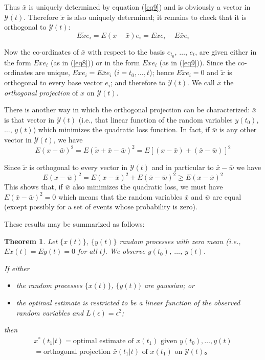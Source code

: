 \documentclass{article}
\newtheorem{theorem}{Theorem}
\newcommand{\manf}[1]{\mathbf{\mathcal{#1}}}
\begin{document}
Thus $\bar{x}$ is uniquely determined by equation (\ref{eq9}) and is obviously a vector in $\manf{Y}(t)$. Therefore $\tilde{x}$ is also uniquely determined; it remains to check that it is orthogonal to $\manf{Y}(t)$:
\begin{equation*}
E\tilde{x}e_i=E(x-\bar{x})e_i=Exe_i-E\bar{x}e_i
\end{equation*}

Now the co-ordinates of $\bar{x}$ with respect to the basis $e_{t_0}$, $\dotsc$, $e_t$, are given either in the form $E\bar{x}e_i$ (as in (\ref{eq8})) or in the form $Exe_i$ (as in (\ref{eq9})). Since the co-ordinates are unique, $Exe_i = E\bar{x}e_i$ ($i = t_0, ..., t$); hence $E\tilde{x}e_i = 0$ and $\tilde{x}$ is orthogonal to every base vector $e_i$; and therefore to $\manf{Y}(t)$. We call $\bar{x}$ the \emph{orthogonal projection} of $x$ on $\manf{Y}(t)$.

There is another way in which the orthogonal projection can be characterized: $\bar{x}$ is that vector in $\manf{Y}(t)$ (i.e., that linear function of the random variables $y(t_0)$, $\dotsc$, $y(t)$) which minimizes the quadratic loss function. In fact, if $\bar{w}$ is any other vector in $\manf{Y}(t)$, we have
\begin{equation*}
E(x-\bar{w})^2=E(\tilde{x}+\bar{x}-\bar{w})^2=E[(x-\bar{x})+(\bar{x}-\bar{w})]^2
\end{equation*}

Since $\tilde{x}$ is orthogonal to every vector in $\manf{Y}(t)$ and in particular to $\bar{x} - \bar{w}$ we have
\begin{equation}
\label{eq10}
E(x-\bar{w})^2=E(x-\bar{x})^2+E(\bar{x}-\bar{w})^2 \ge E(x-\bar{x})^2
\end{equation}
This shows that, if $\bar{w}$ also minimizes the quadratic loss, we must have $E(\bar{x} - \bar{w})^2 = 0$ which means that the random variables $\bar{x}$ and $\bar{w}$ are equal (except possibly for a set of events whose probability is zero).

These results may be summarized as follows:
\begin{theorem}
\label{th2}
Let $\{x(t)\}$, $\{y(t)\}$ random processes with zero mean (i.e., $Ex(t) = Ey(t) = 0$ for all $t$). We observe $y(t_0)$, $\dotsc$, $y(t)$.

If either
\begin{itemize}
\item[A] the random processes $\{x(t)\}$, $\{y(t)\}$ are gaussian; or
\item[B] the optimal estimate is restricted to be a linear function of the observed random variables and $L(\epsilon) = \epsilon^2$;
\end{itemize}
then
\begin{multline}
\label{eq11}
x^\ast (t_1 \vert t) = \text{optimal estimate of }x(t_1)\text{ given }y(t_0),\dotsc,y(t)\\
=\text{orthogonal projection }\bar{x}(t_1 \vert t)\text{ of }x(t_1)\text{ on }\mathbf{\mathcal{Y}}(t)。
\end{multline}
\end{theorem}
\end{document}
